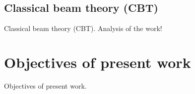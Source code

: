 \documentclass[a4paper, 12pt ]{report}
\begin{document}
	\subsection{Classical beam theory (CBT)}
	Classical beam theory (CBT). Analysis of the work! \cite{article}
	\section{Objectives of present work}
	Objectives of present work.
	
	
	
	\newpage
	\pagestyle{plain}
	{\\}
	\begin{spacing}{1.5}
		\renewcommand\bibname{}
		\vspace*{-5\baselineskip}
		\begingroup
		\let\clearpage\relax
		{}
		
		\endgroup
	\end{spacing}
	
\end{document}
